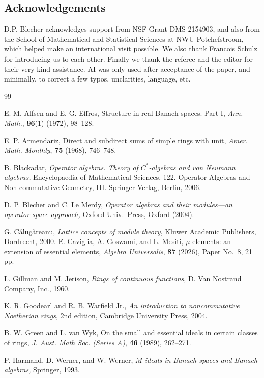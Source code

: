 \documentclass[11pt,leqno]{amsart}
\theoremstyle{definition}
\theoremstyle{remark}
\numberwithin{equation}{section}
\numberwithin{equation}{section}
\begin{document}
\subsection*{Acknowledgements}D.P. Blecher acknowledges support from NSF Grant DMS-2154903, and also from the School of Mathematical and Statistical Sciences at NWU Potchefstroom, which helped make an international visit possible.  We also thank Francois Schulz for introducing us to each other.  Finally we thank the referee and the editor for their very kind assistance.  AI was only used after acceptance of the paper, and minimally, to correct a few typos, unclarities, language, etc.

\begin{thebibliography}{99}


E. M. Alfsen and E. G. Effros, Structure in real Banach spaces. Part I, \textit{Ann. Math.}, \textbf{96}(1) (1972), 98--128.

E. P. Armendariz, Direct and subdirect sums of simple rings with unit, \textit{Amer. Math. Monthly}, \textbf{75}
 (1968), 746--748.
 
 B. Blackadar, \textit{Operator algebras. Theory of $C^*\!\!$-algebras and von Neumann algebras,} Encyclopaedia of Mathematical Sciences, 122. Operator Algebras and Non-commutative Geometry, III. Springer-Verlag, Berlin, 2006. 

 D. P. Blecher and C.  Le Merdy, \textit{Operator algebras and their modules---an
operator space approach,} Oxford Univ.\  Press, Oxford (2004).

G. C\v{a}lug\v{a}reanu, \textit{Lattice concepts of module theory}, Kluwer Academic Publishers, Dordrecht, 2000.
 E. Caviglia, A. Goswami, and L. Mesiti, $\mu$-elements: an extension of essential elements, \textit{Algebra Universalis}, \textbf{87} (2026),  Paper No.\ 8,
21 pp.

 L. Gillman and M. Jerison, \textit{Rings of continuous functions}, D. Van Nostrand Company, Inc., 1960.


 K. R. Goodearl and R. B. Warfield Jr., \textit{An introduction to noncommutative
Noetherian rings}, 2nd edition, Cambridge University Press, 2004.

B. W. Green and L. van Wyk, On the small and essential ideals in certain classes of rings, \textit{J. Aust. Math Soc. (Series A)}, \textbf{46} (1989), 262--271.

 P. Harmand, D. Werner, and W. Werner,  \textit{$M$-ideals in Banach spaces and Banach algebras,} Springer, 1993.


\end{thebibliography}
\end{document}
